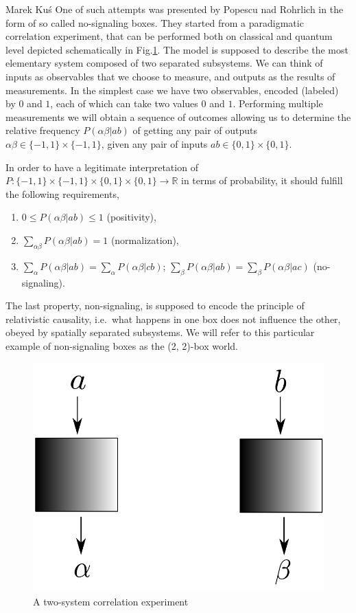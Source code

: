 \begin{artengenv}{Marek Ku\'s}
One of such attempts was presented by Popescu nad Rohrlich \parencite*{popescu_quantum_1994} in the form of so called no-signaling boxes. They started from a paradigmatic correlation experiment, that can be performed both on classical and quantum level depicted schematically in Fig.\ref{fig:bellex1}. The model is supposed to describe the most elementary system composed of two separated subsystems. We can think of inputs as observables that we choose to measure, and outputs as the results of measurements. In the simplest case we have two observables, encoded (labeled) by $0$ and $1$, each of which can take two values $0$ and $1$. Performing multiple measurements we will obtain a sequence of outcomes allowing us to determine the relative frequency $P(\alpha\beta| ab)$ of getting any pair of outputs $\alpha\beta\in  \{-1, 1\}\times \{-1, 1\}$, given any pair of inputs $a b \in  \{0, 1\}\times \{0, 1\}$.

In order to have a legitimate interpretation of $P: \{-1, 1\}\times \{-1, 1\}\times \{0, 1\}\times \{0, 1\}\rightarrow \mathbb{R}$ in terms of probability, it should fulfill the following requirements,
\begin{enumerate}
	\item $ 0\le P(\alpha\beta| ab)\le 1 $ (positivity),
	\item $ \sum_{\alpha\beta}P(\alpha\beta| ab)=1 $ (normalization),
	\item $ \sum_\alpha P(\alpha\beta| ab)=\sum_\alpha P(\alpha\beta| cb)  $; $ \sum_\beta  P(\alpha\beta| ab)=\sum_\beta  P(\alpha\beta| ac)  $ (no-signaling).
\end{enumerate}
The last property, non-signaling, is supposed to encode the principle of relativistic causality, i.e.\ what happens in one box does not influence the other, obeyed by spatially separated subsystems. We will refer to this particular example of non-signaling boxes as the (2, 2)-box world.

\begin{figure}
	\centering
	\includegraphics[width=0.7\linewidth]{ART_Kus/BellEx1}
	\caption{A two-system correlation experiment}
	\label{fig:bellex1}
\end{figure}



\end{artengenv}
